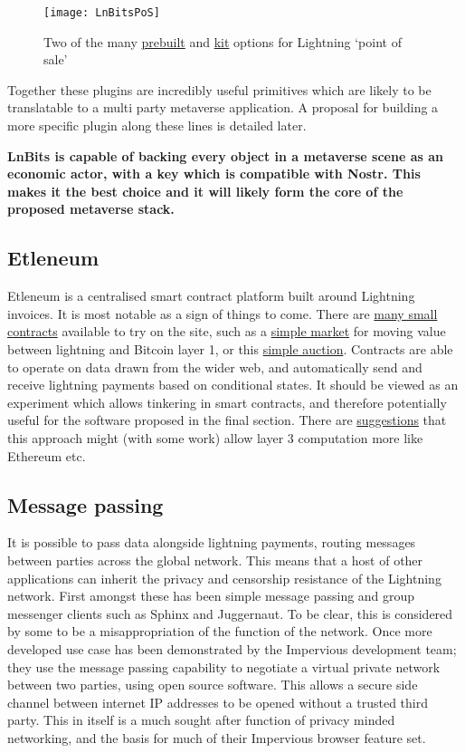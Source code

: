 \begin{figure}
  \centering
    \texttt{[image: LnBitsPoS]}
  \caption{Two of the many \href{https://rapaygo.com/}{prebuilt} and \href{https://github.com/arcbtc/LNURLPoS}{kit} options for Lightning `point of sale'}
  \label{fig:LnBitsPoS}
\end{figure}
Together these plugins are incredibly useful primitives which are likely to be translatable to a multi party metaverse application. A proposal for building a more specific plugin along these lines is detailed later.\par
\textbf{LnBits is capable of backing every object in a metaverse scene as an economic actor, with a key which is compatible with Nostr. This makes it the best choice and it will likely form the core of the proposed metaverse stack.}
\subsection{Etleneum}
Etleneum is a centralised smart contract platform built around Lightning invoices. It is most notable as a sign of things to come. There are \href{https://etleneum.com/#/contracts}{many small contracts} available to try on the site, such as a \href{https://etleneum.com/#/contract/c8w0c13v75}{simple market} for moving value between lightning and Bitcoin layer 1, or this \href{https://simple-auction.etleneum.com/}{simple auction}.  Contracts are able to operate on data drawn from the wider web, and automatically send and receive lightning payments based on conditional states. It should be viewed as an experiment which allows tinkering in smart contracts, and therefore potentially useful for the software proposed in the final section. There are \href{https://notgeld.medium.com/lightning-network-computation-layer-27c7ba81a214}{suggestions} that this approach might (with some work) allow layer 3 computation more like Ethereum etc.
\subsection{Message passing}
It is possible to pass data alongside lightning payments, routing messages between parties across the global network. This means that a host of other applications can inherit the privacy and censorship resistance of the Lightning network. First amongst these has been simple message passing and group messenger clients such as Sphinx and Juggernaut. To be clear, this is considered by some to be a misappropriation of the function of the network. Once more developed use case has been demonstrated by the Impervious development team; they use the message passing capability to negotiate a virtual private network between two parties, using open source software. This allows a secure side channel between internet IP addresses to be opened without a trusted third party. This in itself is a much sought after function of privacy minded networking, and the basis for much of their Impervious browser feature set. 
